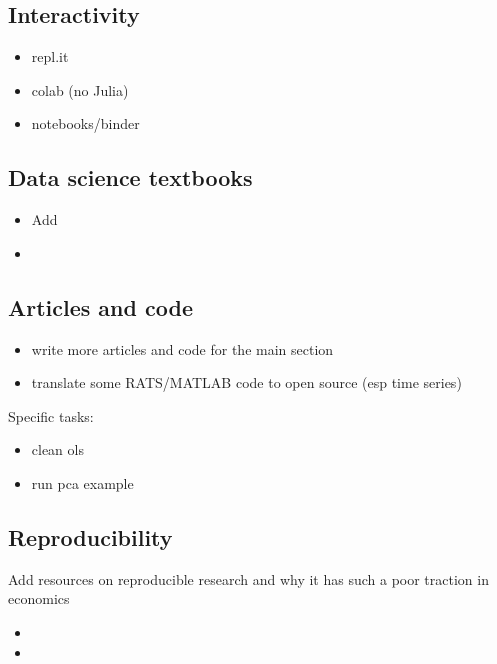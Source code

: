 \documentclass[letterpaper,10pt,english]{sphinxmanual}
\begin{document}
\subsection{Interactivity}
\label{\detokenize{roadmap:interactivity}}\begin{itemize}
\item {} 
repl.it

\item {} 
colab (no Julia)

\item {} 
notebooks/binder

\end{itemize}


\subsection{Data science textbooks}
\label{\detokenize{roadmap:data-science-textbooks}}\begin{itemize}
\item {} 
Add  

\item {} 

\end{itemize}


\subsection{Articles and code}
\label{\detokenize{roadmap:articles-and-code}}\begin{itemize}
\item {} 
write more articles and code for the main section

\item {} 
translate some RATS/MATLAB code to open source (esp time series)

\end{itemize}

Specific tasks:
\begin{itemize}
\item {} 
clean ols

\item {} 
run pca example

\end{itemize}


\subsection{Reproducibility}
\label{\detokenize{roadmap:reproducibility}}
Add resources on reproducible research and why it has such a poor traction in economics
\begin{itemize}
\item {} 

\item {} 

\end{itemize}
\end{document}
